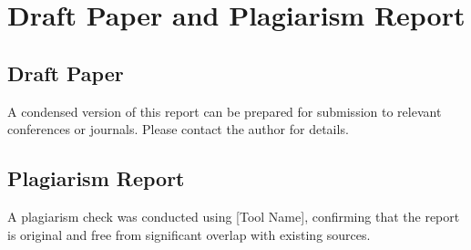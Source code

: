 \documentclass[12pt, a4paper]{report}
\begin{document}
\clearpage
\appendix
\chapter{Draft Paper and Plagiarism Report}

\section{Draft Paper}
A condensed version of this report can be prepared for submission to relevant conferences or journals. Please contact the author for details.

\section{Plagiarism Report}
A plagiarism check was conducted using [Tool Name], confirming that the report is original and free from significant overlap with existing sources.
\end{document}
